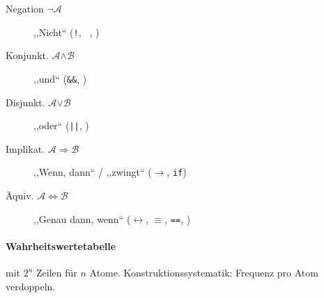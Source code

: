 \begin{description}
  \item [Negation
        $\boldsymbol{\neg} \mathcal{A}$]
        ,,Nicht``
        (\texttt{!}, \texttt{~},
        )

  \item [Konjunkt.
        $\mathcal{A} \boldsymbol{\land} \mathcal{B}$]
        ,,und``
        (\texttt{&&},
        )

  \item [Disjunkt.
        $\mathcal{A} \boldsymbol{\lor} \mathcal{B}$]
        ,,oder``
        (\texttt{||},
        )

  \item [Implikat.
        $\mathcal{A} \boldsymbol{\Rightarrow} \mathcal{B}$]
        ,,Wenn, dann`` / \linebreak ,,zwingt``
        ($\rightarrow$, \texttt{if})

  \item [Äquiv.
        $\mathcal{A} \boldsymbol{\Leftrightarrow} \mathcal{B}$]
        ,,Genau dann, wenn``
        ($\leftrightarrow$, $\equiv$,
        \texttt{==},
        )
\end{description}


\paragraph{Wahrheitswertetabelle} mit $2^n$ Zeilen für $n$ Atome. Konstruktionssystematik: Frequenz pro Atom verdoppeln.

